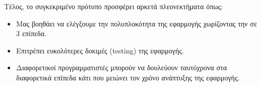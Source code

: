 Τέλος, το συγκεκριμένο πρότυπο προσφέρει αρκετά πλεονεκτήματα όπως:

\begin{itemize}
    \item Μας βοηθάει να ελέγξουμε την πολυπλοκότητα της εφαρμογής χωρίζοντας την σε 3 επίπεδα.
    \item Επιτρέπει ευκολότερες δοκιμές (testing) της εφαρμογής.
    \item Διαφορετικοί προγραμματιστές μπορούν να δουλεύουν ταυτόχρονα στα διαφορετικά επίπεδα κάτι που μειώνει τον χρόνο ανάπτυξης της εφαρμογής.
    
\end{itemize}